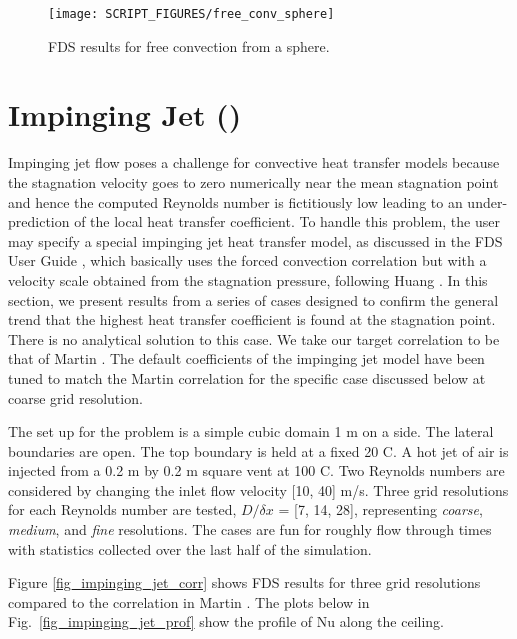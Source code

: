 \documentclass[11pt]{book}
\begin{document}
\begin{figure}[h]
   \centering
   \texttt{[image: SCRIPT\_FIGURES/free\_conv\_sphere]}
   \caption[Nusselt correlation free convection from a sphere]{\label{fig_free_conv_sphere} FDS results for free convection from a sphere.}
\end{figure}


\clearpage
\section{Impinging Jet (\texorpdfstring{}{impinging\_jet})}
\label{sec:impinging_jet}

Impinging jet flow poses a challenge for convective heat transfer models because the stagnation velocity goes to zero numerically near the mean stagnation point and hence the computed Reynolds number is fictitiously low leading to an under-prediction of the local heat transfer coefficient.  To handle this problem, the user may specify a special impinging jet heat transfer model, as discussed in the FDS User Guide \cite{FDS_Users_Guide}, which basically uses the forced convection correlation but with a velocity scale obtained from the stagnation pressure, following Huang \cite{Huang:1963,Livingood:1973}.  In this section, we present results from a series of cases designed to confirm the general trend that the highest heat transfer coefficient is found at the stagnation point.  There is no analytical solution to this case.  We take our target correlation to be that of Martin \cite{Martin:1977,Incropera:1}.  The default coefficients of the impinging jet model have been tuned to match the Martin correlation for the specific case discussed below at coarse grid resolution.

The set up for the problem is a simple cubic domain 1 m on a side.  The lateral boundaries are open.  The top boundary is held at a fixed 20 C.  A hot jet of air is injected from a 0.2 m by 0.2 m square vent at 100 C.  Two Reynolds numbers are considered by changing the inlet flow velocity [10, 40] m/s.  Three grid resolutions for each Reynolds number are tested, $D/\delta x$ = [7, 14, 28], representing \emph{coarse}, \emph{medium}, and \emph{fine} resolutions.  The cases are fun for roughly flow through times with statistics collected over the last half of the simulation.

Figure \ref{fig_impinging_jet_corr} shows FDS results for three grid resolutions compared to the correlation in Martin \cite{Martin:1977,Incropera:1}.  The plots below in Fig.~\ref{fig_impinging_jet_prof} show the profile of Nu along the ceiling.
\end{document}
